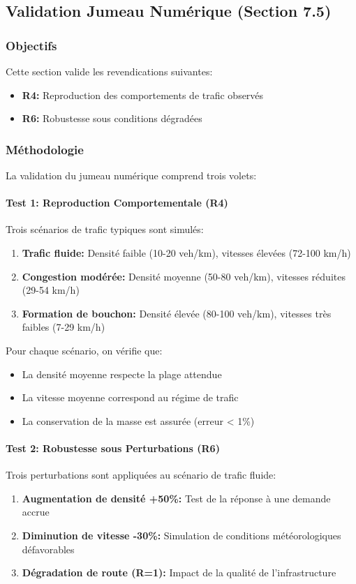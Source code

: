 \subsection{Validation Jumeau Numérique (Section 7.5)}

\subsubsection{Objectifs}
Cette section valide les revendications suivantes:
\begin{itemize}
    \item \textbf{R4:} Reproduction des comportements de trafic observés
    \item \textbf{R6:} Robustesse sous conditions dégradées
\end{itemize}

\subsubsection{Méthodologie}

La validation du jumeau numérique comprend trois volets:

\paragraph{Test 1: Reproduction Comportementale (R4)}
Trois scénarios de trafic typiques sont simulés:
\begin{enumerate}
    \item \textbf{Trafic fluide:} Densité faible (10-20 veh/km), vitesses élevées (72-100 km/h)
    \item \textbf{Congestion modérée:} Densité moyenne (50-80 veh/km), vitesses réduites (29-54 km/h)
    \item \textbf{Formation de bouchon:} Densité élevée (80-100 veh/km), vitesses très faibles (7-29 km/h)
\end{enumerate}

Pour chaque scénario, on vérifie que:
\begin{itemize}
    \item La densité moyenne respecte la plage attendue
    \item La vitesse moyenne correspond au régime de trafic
    \item La conservation de la masse est assurée (erreur < 1\%)
\end{itemize}

\paragraph{Test 2: Robustesse sous Perturbations (R6)}
Trois perturbations sont appliquées au scénario de trafic fluide:
\begin{enumerate}
    \item \textbf{Augmentation de densité +50\%:} Test de la réponse à une demande accrue
    \item \textbf{Diminution de vitesse -30\%:} Simulation de conditions météorologiques défavorables
    \item \textbf{Dégradation de route (R=1):} Impact de la qualité de l'infrastructure
\end{enumerate}


